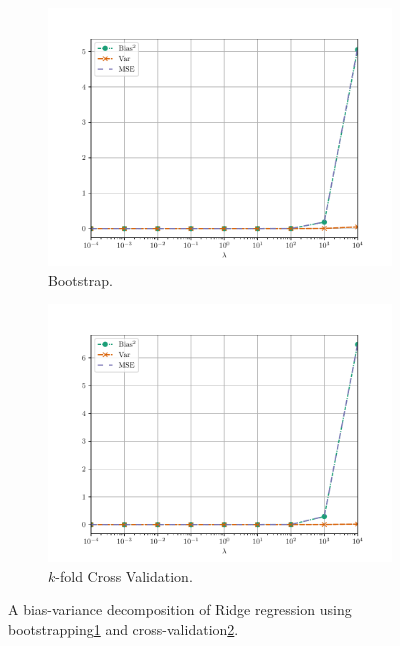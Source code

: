 \begin{figure}[H]
    \centering
    \begin{subfigure}[b]{0.5\textwidth}
        \centering
        \includegraphics[scale=0.5]{../fig/ridge_bs_bias_variance_analysis.pdf}
        \caption{Bootstrap.}
        \label{fig:linreg-bias-variance-decomp-bs-ridge}
    \end{subfigure}%
    \begin{subfigure}[b]{0.5\textwidth}
        \centering
        \includegraphics[scale=0.5]{../fig/ridge_cv_bias_variance_analysis.pdf}
        \caption{$k$-fold Cross Validation.}
        \label{fig:linreg-bias-variance-decomp-cv-ridge}
    \end{subfigure}
    \caption{A bias-variance decomposition of Ridge regression using bootstrapping\ref{fig:linreg-bias-variance-decomp-bs-ridge} and cross-validation\ref{fig:linreg-bias-variance-decomp-cv-ridge}.}
    \label{fig:linreg-bias-variance-decomp-ridge}
\end{figure}

